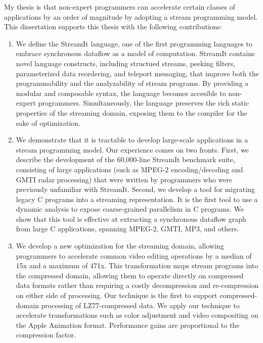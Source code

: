 \label{chap:conclusions}

My thesis is that non-expert programmers can accelerate certain
classes of applications by an order of magnitude by adopting a stream
programming model.  This dissertation supports this thesis with the
following contributions:

\begin{enumerate}

\item We define the StreamIt language, one of the first programming 
languages to embrace synchronous dataflow as a model of computation.
StreamIt contains novel language constructs, including structued
streams, peeking filters, parameterized data reordering, and teleport
messaging, that improve both the programmability and the analyzability
of stream programs.  By providing a modular and composable syntax, the
language becomes accesible to non-expert programmers.  Simultaneously,
the language preserves the rich static properties of the streaming
domain, exposing them to the compiler for the sake of optimization.

\item We demonstrate that it is tractable to develop large-scale 
applications in a stream programming model.  Our experience comes on
two fronts.  First, we describe the development of the 60,000-line
StreamIt benchmark suite, consisting of large applications (such as
MPEG-2 encoding/decoding and GMTI radar processing) that were written
by programmers who were previously unfamiliar with StreamIt.  Second,
we develop a tool for migrating legacy C programs into a streaming
representation.  It is the first tool to use a dynamic analysis to
expose coarse-grained parallelism in C programs.  We show that this
tool is effective at extracting a synchronous dataflow graph from
large C applications, spanning MPEG-2, GMTI, MP3, and others.

\item We develop a new optimization for the streaming domain, allowing 
programmers to accelerate common video editing operations by a median
of 15x and a maximum of 471x.  This transformation maps stream
programs into the compressed domain, allowing them to operate directly
on compressed data formats rather than requiring a costly
decompression and re-compression on either side of processing.  Our
technique is the first to support compressed-domain processing of
LZ77-compressed data.  We apply our technique to accelerate
transformations such as color adjustment and video compositing on the
Apple Animation format.  Performance gains are proportional to the
compression factor.


\end{enumerate}
